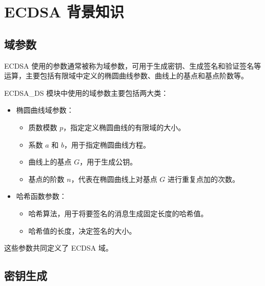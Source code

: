 \documentclass[main\_\_CN.tex]{subfiles}
\begin{document}

\label{sec:ecdsa-terminology}

\section{ECDSA 背景知识}
\subsection{域参数}

ECDSA 使用的参数通常被称为域参数，可用于生成密钥、生成签名和验证签名等运算，主要包括有限域中定义的椭圆曲线参数、曲线上的基点和基点阶数等。

ECDSA\_DS 模块中使用的域参数主要包括两大类：

\begin{itemize}
    \item 椭圆曲线域参数：
          \begin{itemize}
              \item 质数模数 $p$，指定定义椭圆曲线的有限域的大小。
              \item 系数 $a$ 和 $b$，用于指定椭圆曲线方程。
              \item 曲线上的基点 $G$，用于生成公钥。
              \item 基点的阶数 $n$，代表在椭圆曲线上对基点 $G$ 进行重复点加的次数。
          \end{itemize}
    \item 哈希函数参数：
          \begin{itemize}
              \item 哈希算法，用于将要签名的消息生成固定长度的哈希值。
              \item 哈希值的长度，决定签名的大小。
          \end{itemize}
\end{itemize}

这些参数共同定义了 ECDSA 域。

\subsection{密钥生成}
\end{document}
